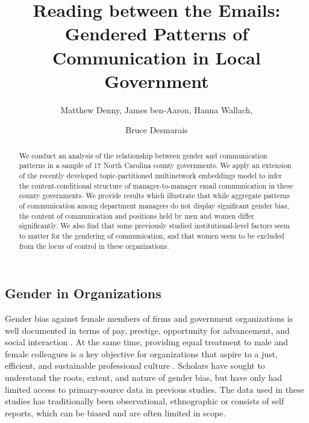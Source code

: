 \documentclass{pnastwo}
\begin{document}
\title{Reading between the Emails: Gendered Patterns of Communication in Local Government}

\author{
Matthew Denny,
James ben-Aaron,
Hanna Wallach,
\and Bruce Desmarais
}

\contributor{\vspace{-.25cm}}


\maketitle

\begin{article}
\begin{abstract}
{We conduct an analysis of the relationship between gender and communication patterns in a sample of 17 North Carolina county governments. We apply an extension of the recently developed topic-partitioned multinetwork embeddings model to infer the content-conditional structure of manager-to-manager email communication in these county governments. We provide results which illustrate that while aggregate patterns of communication among department managers do not display significant gender bias, the content of communication and positions held by men and women differ significantly. We also find that some previously studied institutional-level factors seem to matter for the gendering of communication, and that women seem to be excluded from the locus of control in these organizations.
}
\end{abstract} 



\section{Gender in Organizations}
Gender bias against female members of firms and government organizations is well documented in terms of pay, prestige, opportunity for advancement, and social interaction \citep{Brass1985, Bielby1986a, Ibarra1992, Albrecht2003, Duncan2004}. At the same time, providing equal treatment to male and female colleagues is a key objective for organizations that aspire to a just, efficient, and sustainable professional culture \citep{Ely2000}. Scholars have sought to understand the roots, extent, and nature of gender bias, but have only had limited access to primary-source data in previous studies. The data used in these studies \citep[e.g.,][]{Castilla2005, Adams2007, Elsesser2011} has traditionally been observational, ethnographic or consists of self reports, which can be biased and are often limited in scope. 
	

\end{article}
\end{document}
